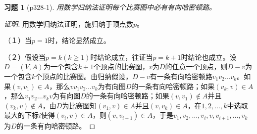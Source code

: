\documentclass{article}
\begin{document}
\begin{CJK}{UTF8}{gbsn}
\newtheorem*{Exercise}{习题}
\begin{Exercise}[p328-1]
用数学归纳法证明每个比赛图中必有有向哈密顿路。
\end{Exercise}
\begin{proof}[证明]
  用数学归纳法证明，施归纳于顶点数$p$。

  （１）当$p=1$时，结论显然成立。

  （２）假设当$p=k(k\geq 1)$时结论成立，往证当$p=k+1$时结论也成立。设$D=(V,A)$为一个包含$k+1$个顶点的比赛图，$v$为$D$的任意一个顶点，则$D-v$为一个包含$k$个顶点的比赛图。由归纳假设，$D-v$有一条有向哈密顿路$v_1v_2\ldots v_k$。如果$(v,v_1)\in A$，那么$vv_1v_2\ldots v_k$为有向图$D$的一条有向哈密顿路；如果$(v_k,v)\in A$，那么$v_1v_2\ldots v_kv$为有向图$D$的一条有向哈密顿路；如果$(v,v_1)\notin A$并且$(v_k,v)\notin A$，由$D$为比赛图知$(v_1,v)\in A$并且$(v,v_k)\in A$，在$1,2,\ldots, k$中选取最大的下标$i$使得$(v_i,v)\in A$，则$(v,v_{i+1})\in A$，于是$v_1,v_2,\ldots,v_i,v,v_{i+1},\ldots,v_k$为$D$的一条有向哈密顿路。 
\end{proof}

\end{CJK}
\end{document}
